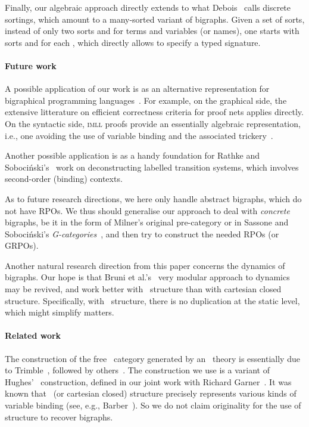 \documentclass{llncs}
\newcommand{\imll}{\textsc{imll}}
\begin{document}
Finally, our algebraic approach directly extends to what
Debois~\cite{Debois:phd} calls discrete sortings, which amount to a
many-sorted variant of bigraphs. Given a set  of sorts, instead of
only two sorts  and  for terms and variables (or names), one
starts with sorts  and  for each , which directly
allows to specify a typed signature.

\paragraph{Future work}
A possible application of our work is as an alternative representation
for bigraphical programming
languages~\cite{Damgaard:Matching}.  For example,
on the graphical side, the extensive litterature on efficient
correctness criteria for proof nets applies directly.  On the
syntactic side, \imll{} proofs provide an essentially algebraic
representation, i.e., one avoiding the use of variable binding and the
associated
trickery~\cite{PfenningElliott:hoas,PittsAM:newaas,hofmann:presheaf}.

Another possible application is as a handy foundation for Rathke and
\linebreak Soboci\'{n}ski's~\cite{modularLTS} work on deconstructing labelled
transition systems, which involves second-order (binding) contexts.

As to future research directions, we here only handle abstract
bigraphs, which do not have RPOs. We thus should generalise our
approach to deal with \emph{concrete} bigraphs, be it in the form of
Milner's original pre-category or in Sassone and Soboci\'{n}ski's
\emph{G-categories}~\cite{Sobocinski:grpos}, and then try to construct
the needed RPOs (or GRPOs).  

Another natural research direction from this paper concerns the
dynamics of bigraphs.  Our hope is that Bruni et
al.'s~\cite{Bruni:ccdc} very modular approach to dynamics may be
revived, and work better with \smc\ structure than with cartesian
closed structure. Specifically, with \smc\ structure, there is no
duplication at the static level, which might simplify matters.

\paragraph{Related work}
The construction of the free \smc\ category generated by an \smc\
theory is essentially due to Trimble~\cite{Trimble:phd}, followed by
others~\cite{Tan:phd,Hughes:freestar,Lamarche:nets}.  The construction
we use is a variant of Hughes'~\cite{Hughes:freestar} construction,
defined in our joint work with Richard Garner~\cite{GHP}.  It was
known that \smc\ (or cartesian closed) structure precisely represents
various kinds of variable binding (see, e.g.,
Barber~\cite{Barber:action}).  So we do not claim originality for the
use of \smc{} structure to recover bigraphs.
\end{document}

